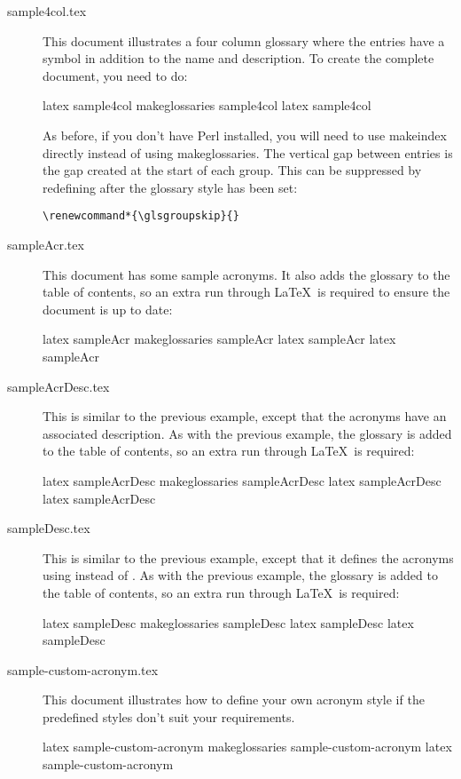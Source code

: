 \documentclass{nlctdoc}
\renewcommand*{\glsgroupskip}{}
\begin{document}
\begin{description}
\item[sample4col.tex]\label{ex:sample4col} This document illustrates
a four column glossary where the entries have a symbol in addition
to the name and description. To create the complete document, you
need to do:
\begin{prompt}
latex sample4col
makeglossaries sample4col
latex sample4col
\end{prompt}
As before, if you don't have Perl installed, you will need to use
\gls{makeindex} directly instead of using
\gls{makeglossaries}. The vertical gap between entries is the
gap created at the start of each group. This can be suppressed by
redefining  after the glossary style has been set:
\begin{verbatim}
\renewcommand*{\glsgroupskip}{}
\end{verbatim}

\item[sampleAcr.tex]\label{ex:sampleAcr} This document has some
sample acronyms. It also adds the glossary to the table of contents,
so an extra run through \LaTeX\ is required to ensure the document
is up to date:
\begin{prompt}
latex sampleAcr
makeglossaries sampleAcr
latex sampleAcr
latex sampleAcr
\end{prompt}

\item[sampleAcrDesc.tex]\label{ex:sampleAcrDesc} This is similar to
the previous example, except that the acronyms have an associated
description. As with the previous example, the glossary is added to
the table of contents, so an extra run through \LaTeX\ is required:
\begin{prompt}
latex sampleAcrDesc
makeglossaries sampleAcrDesc
latex sampleAcrDesc
latex sampleAcrDesc
\end{prompt}

\item[sampleDesc.tex]\label{ex:sampleDesc} This is similar to the
previous example, except that it defines the acronyms using
 instead of . As with the
previous example, the glossary is added to the table of contents, so
an extra run through \LaTeX\ is required:
\begin{prompt}
latex sampleDesc
makeglossaries sampleDesc
latex sampleDesc
latex sampleDesc
\end{prompt}

\item[sample-custom-acronym.tex]\label{ex:sample-custom-acronym}
This document illustrates how to define your own acronym style if
the predefined styles don't suit your requirements.
\begin{prompt}
latex sample-custom-acronym
makeglossaries sample-custom-acronym
latex sample-custom-acronym
\end{prompt}


\end{description}
\end{document}

